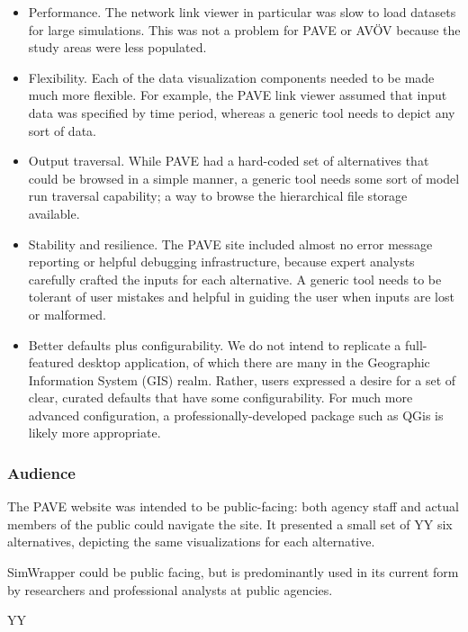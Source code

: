 \begin{itemize}
\item
  Performance. The network link viewer in particular was slow to load
  datasets for large simulations. This was not a problem for PAVE or
  AVÖV because the study areas were less populated.
\item
  Flexibility. Each of the data visualization components needed to be
  made much more flexible. For example, the PAVE link viewer assumed
  that input data was specified by time period, whereas a generic tool
  needs to depict any sort of data.
\item
  Output traversal. While PAVE had a hard-coded set of alternatives that
  could be browsed in a simple manner, a generic tool needs some sort of
  model run traversal capability; a way to browse the hierarchical file
  storage available.
\item
  Stability and resilience. The PAVE site included almost no error
  message reporting or helpful debugging infrastructure, because expert
  analysts carefully crafted the inputs for each alternative. A generic
  tool needs to be tolerant of user mistakes and helpful in guiding the
  user when inputs are lost or malformed.
\item
  Better defaults plus configurability. We do not intend to replicate a
  full-featured desktop application, of which there are many in the
  Geographic Information System (GIS) realm. Rather, users expressed a
  desire for a set of clear, curated defaults that have some
  configurability. For much more advanced configuration, a
  professionally-developed package such as QGis is likely more
  appropriate.
\end{itemize}

\hypertarget{audience}{%
\subsubsection{Audience}\label{audience}}

The PAVE website was intended to be public-facing: both agency staff and
actual members of the public could navigate the site. It presented a
small set of YY six alternatives, depicting the same visualizations for
each alternative.

SimWrapper could be public facing, but is predominantly used in its
current form by researchers and professional analysts at public
agencies.

YY


